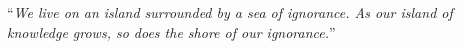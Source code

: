 \documentclass[
12pt, %
english, %
singlespacing, %
liststotoc, %
toctotoc, %
parskip, %
headsepline, %
consistentlayout, %
]{MastersDoctoralThesis} %
\begin{document}
\cleardoublepage


\vspace*{0.2\textheight}



\noindent\enquote{\itshape We live on an island surrounded by a sea of ignorance. As our island of knowledge grows, so does the shore of our ignorance.}\bigbreak



\begin{abstract}
\addchaptertocentry{\abstractname} %

\end{abstract}


\begin{acknowledgements}
\addchaptertocentry{\acknowledgementname} %

\end{acknowledgements}


\tableofcontents %

\listoffigures %

\listoftables %

\end{document}
